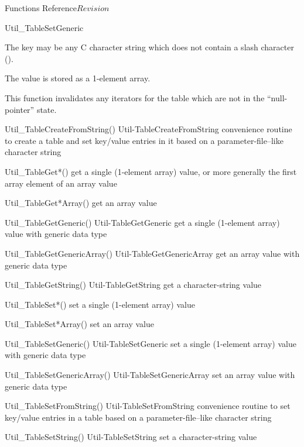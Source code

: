 \begin{cactuspart}{ Functions Reference}{}{$Revision$}
\begin{FunctionDescription}{Util\_TableSetGeneric}
\begin{Discussion}
The key may be any C character string which does not contain a slash
character ().

The value is stored as a 1-element array.

This function invalidates any iterators for the table which are
not in the ``null-pointer'' state.
\end{Discussion}

\begin{SeeAlsoSection}
\begin{SeeAlso2} {Util\_TableCreateFromString()} {Util-TableCreateFromString}
convenience routine to create a table and set key/value entries
in it based on a parameter-file--like character string
\end{SeeAlso2}
\begin{SeeAlso}{Util\_TableGet*()}
get a single (1-element array) value,
or more generally the first array element of an array value
\end{SeeAlso}
\begin{SeeAlso}{Util\_TableGet*Array()}
get an array value
\end{SeeAlso}
\begin{SeeAlso2} {Util\_TableGetGeneric()} {Util-TableGetGeneric}
get a single (1-element array) value with generic data type
\end{SeeAlso2}
\begin{SeeAlso2} {Util\_TableGetGenericArray()} {Util-TableGetGenericArray}
get an array value with generic data type
\end{SeeAlso2}
\begin{SeeAlso2} {Util\_TableGetString()} {Util-TableGetString}
get a character-string value
\end{SeeAlso2}
\begin{SeeAlso}{Util\_TableSet*()}
set a single (1-element array) value
\end{SeeAlso}
\begin{SeeAlso}{Util\_TableSet*Array()}
set an array value
\end{SeeAlso}
\begin{SeeAlso2} {Util\_TableSetGeneric()} {Util-TableSetGeneric}
set a single (1-element array) value with generic data type
\end{SeeAlso2}
\begin{SeeAlso2} {Util\_TableSetGenericArray()} {Util-TableSetGenericArray}
set an array value with generic data type
\end{SeeAlso2}
\begin{SeeAlso2} {Util\_TableSetFromString()} {Util-TableSetFromString}
convenience routine to set key/value entries in a table based on a
parameter-file--like character string
\end{SeeAlso2}
\begin{SeeAlso2} {Util\_TableSetString()} {Util-TableSetString}
set a character-string value
\end{SeeAlso2}
\end{SeeAlsoSection}


\end{FunctionDescription}
\end{cactuspart}
